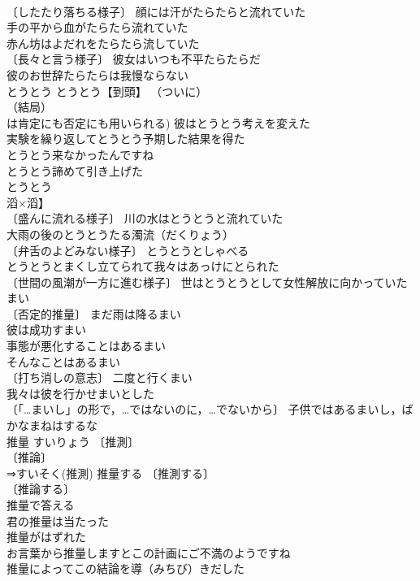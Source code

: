 \documentclass[8pt]{extreport}
\begin{document}
\begin{CJK}{UTF8}{min}
\\	〔したたり落ちる様子〕 顔には汗がたらたらと流れていた 
\\	手の平から血がたらたら流れていた 
\\	赤ん坊はよだれをたらたら流していた 
\\	〔長々と言う様子〕 彼女はいつも不平たらたらだ 
\\	彼のお世辞たらたらは我慢ならない 
\\	とうとう		とうとう【到頭】 （ついに）
\\	（結局）
\\	は肯定にも否定にも用いられる) 彼はとうとう考えを変えた 
\\	実験を繰り返してとうとう予期した結果を得た 
\\	とうとう来なかったんですね 
\\	とうとう諦めて引き上げた 
\\	とうとう
\\	滔×滔】 
\\	〔盛んに流れる様子〕 川の水はとうとうと流れていた 
\\	大雨の後のとうとうたる濁流（だくりょう） 
\\	〔弁舌のよどみない様子〕 とうとうとしゃべる 
\\	とうとうとまくし立てられて我々はあっけにとられた 
\\	〔世間の風潮が一方に進む様子〕 世はとうとうとして女性解放に向かっていた 
\\	まい		
\\	〔否定的推量〕 まだ雨は降るまい 
\\	彼は成功すまい 
\\	事態が悪化することはあるまい 
\\	そんなことはあるまい 
\\	〔打ち消しの意志〕 二度と行くまい 
\\	我々は彼を行かせまいとした 
\\	〔「…まいし」の形で，…ではないのに，…でないから〕 子供ではあるまいし，ばかなまねはするな 
\\	推量	すいりょう	〔推測〕
\\	〔推論〕
\\	⇒すいそく(推測) 推量する 〔推測する〕
\\	〔推論する〕
\\	推量で答える 
\\	君の推量は当たった 
\\	推量がはずれた 
\\	お言葉から推量しますとこの計画にご不満のようですね 
\\	推量によってこの結論を導（みちび）きだした 

\end{CJK}
\end{document}
